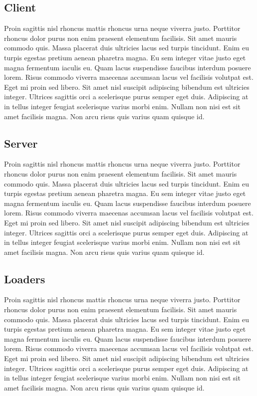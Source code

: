 \documentclass[a4paper,12pt]{article}
\begin{document}
\begin{multicols}{2}
\subsection{Client}
Proin sagittis nisl rhoncus mattis rhoncus urna neque viverra justo. Porttitor rhoncus dolor purus non enim praesent elementum facilisis. Sit amet mauris commodo quis. Massa placerat duis ultricies lacus sed turpis tincidunt. Enim eu turpis egestas pretium aenean pharetra magna. Eu sem integer vitae justo eget magna fermentum iaculis eu. Quam lacus suspendisse faucibus interdum posuere lorem. Risus commodo viverra maecenas accumsan lacus vel facilisis volutpat est. Eget mi proin sed libero. Sit amet nisl suscipit adipiscing bibendum est ultricies integer. Ultrices sagittis orci a scelerisque purus semper eget duis. Adipiscing at in tellus integer feugiat scelerisque varius morbi enim. Nullam non nisi est sit amet facilisis magna. Non arcu risus quis varius quam quisque id.

\subsection{Server}
Proin sagittis nisl rhoncus mattis rhoncus urna neque viverra justo. Porttitor rhoncus dolor purus non enim praesent elementum facilisis. Sit amet mauris commodo quis. Massa placerat duis ultricies lacus sed turpis tincidunt. Enim eu turpis egestas pretium aenean pharetra magna. Eu sem integer vitae justo eget magna fermentum iaculis eu. Quam lacus suspendisse faucibus interdum posuere lorem. Risus commodo viverra maecenas accumsan lacus vel facilisis volutpat est. Eget mi proin sed libero. Sit amet nisl suscipit adipiscing bibendum est ultricies integer. Ultrices sagittis orci a scelerisque purus semper eget duis. Adipiscing at in tellus integer feugiat scelerisque varius morbi enim. Nullam non nisi est sit amet facilisis magna. Non arcu risus quis varius quam quisque id.

\subsection{Loaders}
Proin sagittis nisl rhoncus mattis rhoncus urna neque viverra justo. Porttitor rhoncus dolor purus non enim praesent elementum facilisis. Sit amet mauris commodo quis. Massa placerat duis ultricies lacus sed turpis tincidunt. Enim eu turpis egestas pretium aenean pharetra magna. Eu sem integer vitae justo eget magna fermentum iaculis eu. Quam lacus suspendisse faucibus interdum posuere lorem. Risus commodo viverra maecenas accumsan lacus vel facilisis volutpat est. Eget mi proin sed libero. Sit amet nisl suscipit adipiscing bibendum est ultricies integer. Ultrices sagittis orci a scelerisque purus semper eget duis. Adipiscing at in tellus integer feugiat scelerisque varius morbi enim. Nullam non nisi est sit amet facilisis magna. Non arcu risus quis varius quam quisque id.


\end{multicols}
\end{document}
